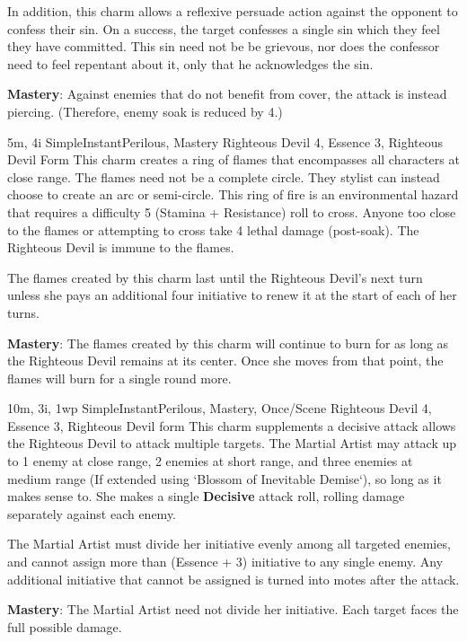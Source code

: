 In addition, this charm allows a reflexive persuade action against the opponent to confess their sin.
On a success, the target confesses a single sin which they feel they have committed.
This sin need not be be grievous, nor does the confessor need to feel repentant about it,
only that he acknowledges the sin.

\textbf{Mastery}: Against enemies that do not benefit from cover, the attack is instead piercing.
(Therefore, enemy soak is reduced by 4.)

{5m, 4i}
{Simple}{Instant}{Perilous, Mastery}
{Righteous Devil 4, Essence 3, Righteous Devil Form}
This charm creates a ring of flames that encompasses all characters at close range.
The flames need not be a complete circle.
They stylist can instead choose to create an arc or semi-circle.
This ring of fire is an environmental hazard that requires a difficulty 5 (Stamina + Resistance) roll to cross.
Anyone too close to the flames or attempting to cross take 4 lethal damage (post-soak).
The Righteous Devil is immune to the flames.

The flames created by this charm last until the Righteous Devil's next turn unless she pays an additional four initiative to renew it at the start of each of her turns.

\textbf{Mastery}: The flames created by this charm will continue to burn for as long as the Righteous Devil remains at its center.
Once she moves from that point, the flames will burn for a single round more.

{10m, 3i, 1wp}
{Simple}{Instant}{Perilous, Mastery, Once/Scene}
{Righteous Devil 4,  Essence 3, Righteous Devil form}
This charm supplements a decisive attack allows the Righteous Devil to attack multiple targets.
The Martial Artist may attack  up to
1 enemy at close range,
2 enemies at short range,
and three enemies at medium range
(If extended using `Blossom of Inevitable Demise`),
so long as it makes sense to.
She makes a single \textbf{Decisive} attack roll,
rolling damage separately against each enemy.

The Martial Artist must divide her initiative evenly among all targeted enemies,
and cannot assign more than (Essence + 3) initiative to any single enemy.
Any additional initiative that cannot be assigned is turned into motes after the attack.

\textbf{Mastery}: The Martial Artist need not divide her initiative.
Each target faces the full possible damage.

